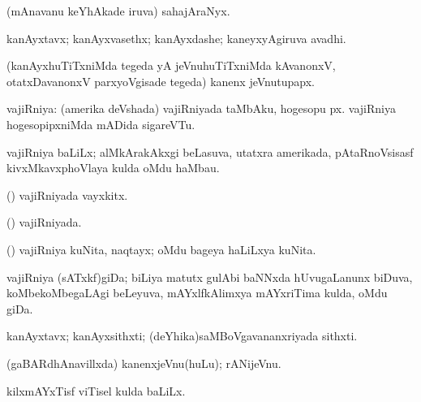 {{{{{{{{\bentry
{} 
\gl{\nA}
\expl{}
\bmng
 (mAnavanu keYhAkade iruva) sahajAraNyx. 
\emng
\eentry

\bentry 
{} 
\gl{\nA}
\expl{}
\bmng
 kanAyxtavx; kanAyxvasethx; kanAyxdashe; kaneyxyAgiruva avadhi. 
\emng
\eentry

\bentry 
{}
\gl{\nA}
\expl{}
\bmng
 (kanAyxhuTiTxniMda tegeda yA jeVnuhuTiTxniMda kAvanonxV, otatxDavanonxV parxyoVgisade tegeda) kanenx jeVnutupapx. 
\emng
\eentry

\bentry 
{} 
\gl{\nA}
\expl{}
\bmng
 vajiRniya: 
\banum
{} (amerika deVshada) vajiRniyada taMbAku, hogesopu px. 
 vajiRniya hogesopipxniMda mADida sigareVTu. 
\eanum
\emng
\eentry

\bentry
{}
\gl{\nA}
\expl{}
\bmng
vajiRniya baLiLx; alMkArakAkxgi beLasuva, utatxra amerikada, pAtaRnoVsisasf kivxMkavxphoVlaya kulda oMdu haMbau. 
\emng
\eentry

\bentry 
{} 
\gl{\nA}
\expl{}
\bmng
 (\ame) vajiRniyada vayxkitx. 
\emng
\eentry

\bentry
{} 
\gl{\gu}
\expl{}
\bmng
 (\ame) vajiRniyada. 
\emng
\eentry

\bentry
{}
\gl{\nA}
\expl{}
\bmng
\emng
\eentry

\bentry
{}
\gl{\nA}
\expl{}
\bmng
 (\ame) vajiRniya kuNita, naqtayx; oMdu bageya haLiLxya kuNita. 
\emng
\eentry

\bentry 
{}
\gl{\nA}
\expl{}
\bmng
 vajiRniya (sATxkf)giDa; biLiya matutx gulAbi baNNxda hUvugaLanunx biDuva, koMbekoMbegaLAgi beLeyuva, mAYxlfkAlimxya mAYxriTima kulda, oMdu giDa. 
\emng
\eentry

\bentry 
{} 
\gl{\nA}
\expl{}
\bmng
 kanAyxtavx; kanAyxsithxti; (deYhika)saMBoVgavananxriyada sithxti. 
\emng
\eentry

\bentry 
{}
\gl{\nA}
\expl{}
\bmng
 (gaBARdhAnavillxda) kanenxjeVnu(huLu); rANijeVnu. 
\emng
\eentry

\bentry
{}
\gl{\nA}
\expl{}
\bmng
 kilxmAYxTisf viTisel kulda baLiLx. 
\emng
\eentry

}}}}}}}}
